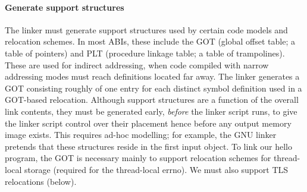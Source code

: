 \documentclass[preprint,10pt]{sigplanconf-pldi16}
\begin{document}
\paragraph{Generate support structures}\label{sec:got-plt}
The linker must generate support structures used by certain code models and relocation schemes.
In most ABIs, these include the GOT (global offset table; a table of pointers) and PLT 
(procedure linkage table; a table of trampolines).
These are used for indirect addressing, when code compiled with narrow addressing modes
must reach definitions located far away.
The linker generates a GOT consisting roughly of one entry 
for each distinct symbol definition used in a GOT-based relocation.
Although support structures are a function of the overall link contents,
they must be generated early, \emph{before} the linker script runs, 
to give the linker script control over their placement
hence before any output memory image exists.
This requires ad-hoc modelling; for example, the GNU linker
pretends that these structures reside in the first input object.
To link our \textsf{hello} program, the GOT is necessary mainly to support 
relocation schemes for thread-local storage
(required for the thread-local \textsf{errno}).
We must also support TLS relocations (below).
\end{document}
